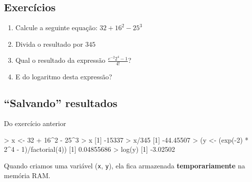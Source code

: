 \documentclass[
  10pt,
  a4paper]{book}
\newenvironment{Shaded}{\begin{snugshade}}{\end{snugshade}}
\newcommand{\DecValTok}[1]{\textcolor[rgb]{0.00,0.00,0.81}{#1}}
\newcommand{\FloatTok}[1]{\textcolor[rgb]{0.00,0.00,0.81}{#1}}
\newcommand{\FunctionTok}[1]{\textcolor[rgb]{0.00,0.00,0.00}{#1}}
\newcommand{\NormalTok}[1]{#1}
\newcommand{\OtherTok}[1]{\textcolor[rgb]{0.56,0.35,0.01}{#1}}
\newcommand{\SpecialCharTok}[1]{\textcolor[rgb]{0.00,0.00,0.00}{#1}}
\providecommand{\tightlist}{%
  \setlength{\itemsep}{0pt}\setlength{\parskip}{0pt}}
\begin{document}
\hypertarget{exercuxedcios}{%
\subsection*{Exercícios}\label{exercuxedcios}}


\begin{enumerate}
\def\labelenumi{\arabic{enumi}.}
\tightlist
\item
  Calcule a seguinte equação: \(32 + 16^2 - 25^3\)
\item
  Divida o resultado por \(345\)
\item
  Qual o resultado da expressão \(\frac{e^{-2} 2^{4} - 1}{4!}\)?
\item
  E do logaritmo desta expressão?
\end{enumerate}

\hypertarget{salvando-resultados}{%
\subsection{``Salvando'' resultados}\label{salvando-resultados}}

Do exercício anterior

\begin{Shaded}
\begin{Highlighting}[]
\SpecialCharTok{\textgreater{}}\NormalTok{ x }\OtherTok{\textless{}{-}} \DecValTok{32} \SpecialCharTok{+} \DecValTok{16}\SpecialCharTok{\^{}}\DecValTok{2} \SpecialCharTok{{-}} \DecValTok{25}\SpecialCharTok{\^{}}\DecValTok{3}
\SpecialCharTok{\textgreater{}}\NormalTok{ x}
\NormalTok{[}\DecValTok{1}\NormalTok{] }\SpecialCharTok{{-}}\DecValTok{15337}
\SpecialCharTok{\textgreater{}}\NormalTok{ x}\SpecialCharTok{/}\DecValTok{345}
\NormalTok{[}\DecValTok{1}\NormalTok{] }\SpecialCharTok{{-}}\FloatTok{44.45507}
\SpecialCharTok{\textgreater{}}\NormalTok{ (y }\OtherTok{\textless{}{-}}\NormalTok{ (}\FunctionTok{exp}\NormalTok{(}\SpecialCharTok{{-}}\DecValTok{2}\NormalTok{) }\SpecialCharTok{*} \DecValTok{2}\SpecialCharTok{\^{}}\DecValTok{4} \SpecialCharTok{{-}} \DecValTok{1}\NormalTok{)}\SpecialCharTok{/}\FunctionTok{factorial}\NormalTok{(}\DecValTok{4}\NormalTok{))}
\NormalTok{[}\DecValTok{1}\NormalTok{] }\FloatTok{0.04855686}
\SpecialCharTok{\textgreater{}} \FunctionTok{log}\NormalTok{(y)}
\NormalTok{[}\DecValTok{1}\NormalTok{] }\SpecialCharTok{{-}}\FloatTok{3.02502}
\end{Highlighting}
\end{Shaded}

Quando criamos uma variável (\texttt{x}, \texttt{y}), ela fica armazenada
\textbf{temporariamente} na memória RAM.
\end{document}
